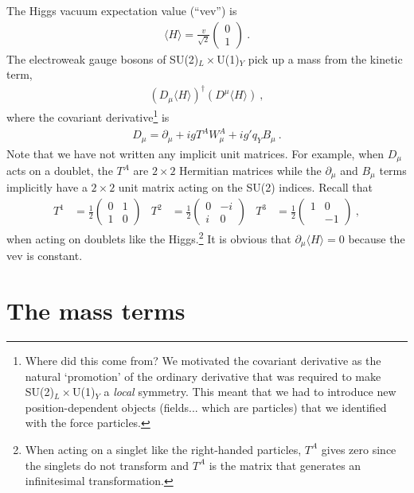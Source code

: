 \documentclass[12pt]{article}
\numberwithin{equation}{section}    %
\begin{document}
The Higgs vacuum expectation value (``vev'') is
\begin{align}
	\langle H \rangle = 
	\frac{v}{\sqrt{2}}
	\begin{pmatrix}
		0\\1
	\end{pmatrix} \ .
\end{align}
The electroweak gauge bosons of SU(2)$_L\times$U(1)$_Y$ pick up a mass from the kinetic term, 
\begin{align}
	\left(D_\mu \langle H\rangle\right)^\dag \left(D^\mu \langle H\rangle\right) \ ,
\end{align}
where the covariant derivative\footnote{Where did this come from? We motivated the covariant derivative as the natural `promotion' of the ordinary derivative that was required to make SU(2)$_L\times$U(1)$_Y$ a \emph{local} symmetry. This meant that we had to introduce new position-dependent objects (fields... which  are particles) that we identified with the force particles.} is
\begin{align}
	D_\mu = \partial_\mu + ig T^A W^A_\mu + ig' q_Y B_\mu \ .
\end{align}
Note that we have not written any implicit unit matrices. For example, when $D_\mu$ acts on a doublet, the $T^A$ are $2\times 2$ Hermitian matrices while  the $\partial_\mu$ and $B_\mu$ terms implicitly have a $2\times 2$ unit matrix acting on the SU(2) indices.
Recall that
\begin{align}
	T^1 &= 
	\frac{1}{2}
	\begin{pmatrix}
		0 & 1\\
		1 & 0
	\end{pmatrix}
	&
	T^2 &= 
	\frac{1}{2}
	\begin{pmatrix}
		0 & -i\\
		i & 0
	\end{pmatrix}
	&
	T^3 &= 
	\frac{1}{2}
	\begin{pmatrix}
		1 & 0\\
		 & -1
	\end{pmatrix} \ ,
\end{align}
when acting on doublets like the Higgs.\footnote{When acting on a singlet like the right-handed particles, $T^A$ gives zero since the singlets do not transform and $T^A$ is the matrix that generates an infinitesimal transformation.}  It is obvious that $\partial_\mu \langle H \rangle = 0$ because the vev is constant.

\section{The mass terms}
\end{document}
